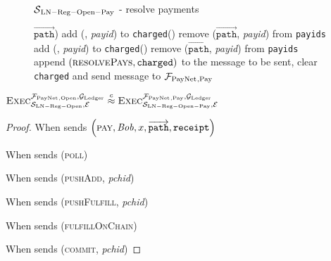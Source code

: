 \begin{figure}[H]
\begin{simulatorbox}{$\mathcal{S}{}_{\mathrm{LN - Reg - Open - Pay}}$ - resolve
  payments}
\begin{algorithmic}[1]
{            $\overrightarrow{\mathtt{path}}$)}
              \State add (\alice, \textit{payid}) to \texttt{charged}(\alice)
              \State remove ($\overrightarrow{\mathtt{path}}$, \textit{payid})
              from \texttt{payids}
             
              \State add (\alice, \textit{payid}) to \texttt{charged}(\alice)
              \State remove ($\overrightarrow{\mathtt{path}}$, \textit{payid})
              from \texttt{payids}
            \EndIf
          \EndFor
        \EndFor
        \State append $\left(\textsc{resolvePays}, \mathtt{charged}\right)$ to
        the message to be sent, clear \texttt{charged} and send message to
        $\mathcal{F}_{\mathrm{PayNet}}{}_{\mathrm{, Pay}}$
      \EndIndent
    \end{algorithmic}
  \end{simulatorbox}
  \caption{}
  \label{alg:sim:resolvepay}
\end{figure}

\begin{lemma}
  \label{lemma:pay}
  $\textsc{Exec}^{\mathcal{F}_{\mathrm{PayNet}}{}_{\mathrm{, Open}}, \mathcal{G}_{\mathrm{Ledger}}}_{\mathcal{S}_{\mathrm{LN
  - Reg - Open}}, \mathcal{E}} \overset{c}{\approx}
  \textsc{Exec}^{\mathcal{F}_{\mathrm{PayNet}}{}_{\mathrm{, Pay}}, \mathcal{G}_{\mathrm{Ledger}}}_{\mathcal{S}_{\mathrm{LN -
  Reg - Open - Pay}}, \mathcal{E}}$
\end{lemma}

\begin{proof}
  When \environment{} sends $\left(\textsc{pay}, \mathit{Bob}, x,
  \overrightarrow{\mathtt{path}}, \mathtt{receipt}\right)$

  When \environment{} sends (\textsc{poll})

  When \environment{} sends (\textsc{pushAdd}, \textit{pchid})

  When \environment{} sends (\textsc{pushFulfill}, \textit{pchid})

  When \environment{} sends (\textsc{fulfillOnChain})

  When \environment{} sends (\textsc{commit}, \textit{pchid})
\end{proof}
